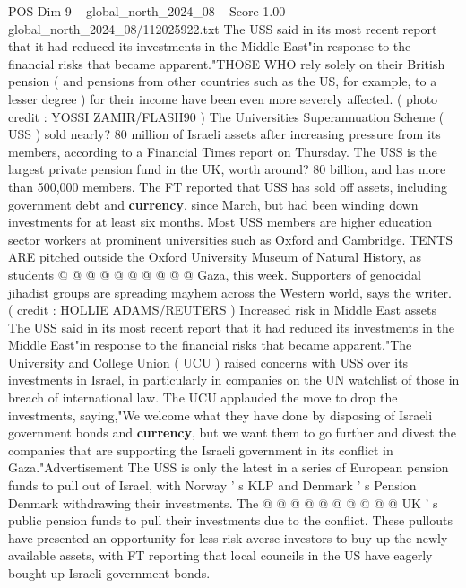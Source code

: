 \begin{textsample}{POS Dim 9 – global\_north\_2024\_08 – Score 1.00 – global\_north\_2024\_08/112025922.txt}  \label{ex:f9_pos_359}
The USS said in its most recent report that it had reduced its investments in the Middle East"in response to the financial risks that became apparent."THOSE WHO rely solely on their British pension ( and pensions from other countries such as the US, for example, to a lesser degree ) for their income have been even more severely affected. ( photo credit : YOSSI ZAMIR/FLASH90 ) The Universities Superannuation Scheme ( USS ) sold nearly? 80 million of Israeli assets after increasing pressure from its members, according to a Financial Times report on Thursday.
The USS is the largest private pension fund in the UK, worth around? 80 billion, and has more than 500,000 members.
The FT reported that USS has sold off assets, including government debt and \textbf{currency}, since March, but had been winding down investments for at least six months.
Most USS members are higher education sector workers at prominent universities such as Oxford and Cambridge.
TENTS ARE pitched outside the Oxford University Museum of Natural History, as students @ @ @ @ @ @ @ @ @ @ Gaza, this week.
Supporters of genocidal jihadist groups are spreading mayhem across the Western world, says the writer. ( credit : HOLLIE ADAMS/REUTERS ) Increased risk in Middle East assets The USS said in its most recent report that it had reduced its investments in the Middle East"in response to the financial risks that became apparent."The University and College Union ( UCU ) raised concerns with USS over its investments in Israel, in particularly in companies on the UN watchlist of those in breach of international law.
The UCU applauded the move to drop the investments, saying,"We welcome what they have done by disposing of Israeli government bonds and \textbf{currency}, but we want them to go further and divest the companies that are supporting the Israeli government in its conflict in Gaza."Advertisement The USS is only the latest in a series of European pension funds to pull out of Israel, with Norway ' s KLP and Denmark ' s Pension Denmark withdrawing their investments.
The @ @ @ @ @ @ @ @ @ @ UK ' s public pension funds to pull their investments due to the conflict.
These pullouts have presented an opportunity for less risk-averse investors to buy up the newly available assets, with FT reporting that local councils in the US have eagerly bought up Israeli government bonds.

\end{textsample}
